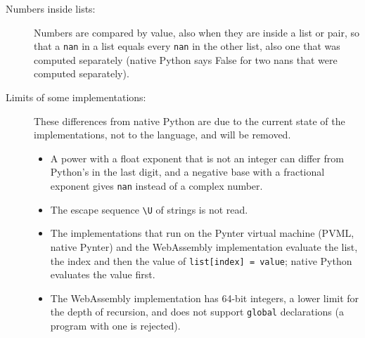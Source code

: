 \begin{description}
\item[{Numbers inside lists:}]
  Numbers are compared by value, also when they are inside a list or pair, so that a
  \texttt{nan} in a list equals every \texttt{nan} in the other list, also one that
  was computed separately (native Python says False for two nans that were computed
  separately).

\item[{Limits of some implementations:}]
  These differences from native Python are due to the current state of the implementations,
  not to the language, and will be removed.
  \begin{itemize}
  \item A power with a float exponent that is not an integer can differ from Python's
    in the last digit, and a negative base with a fractional exponent gives \texttt{nan}
    instead of a complex number.
  \item The escape sequence \texttt{\textbackslash U} of strings is not read.
  \item The implementations that run on the Pynter virtual machine (PVML, native Pynter)
    and the WebAssembly implementation evaluate the list, the index and then the value
    of \texttt{list[index] = value}; native Python evaluates the value first.
  \item The WebAssembly implementation has 64-bit integers, a lower limit for the
    depth of recursion, and does not support \texttt{global} declarations (a program with one is
    rejected).
  \end{itemize}
\end{description}
